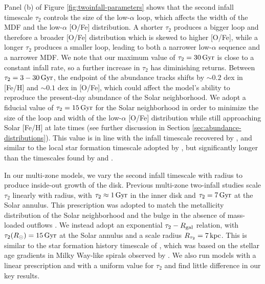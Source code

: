 \documentclass[twocolumn,twocolappendix,linenumbers]{aastex631}
\newcommand{\todo}[1]{{\color{red}#1}}
\newcommand{\kpc}{\,{\rm kpc}}
\newcommand{\Gyr}{\,{\rm Gyr}}
\begin{document}
Panel (b) of Figure \ref{fig:twoinfall-parameters} shows that 
the second infall timescale $\tau_2$ controls the size of the low-$\alpha$ loop, which affects the width of the MDF and the low-$\alpha$ [O/Fe] distribution. A shorter $\tau_2$ produces a bigger loop and therefore a broader [O/Fe] distribution which is skewed to higher [O/Fe], while a longer $\tau_2$ produces a smaller loop, leading to both a narrower low-$\alpha$ sequence and a narrower MDF. We note that our maximum value of $\tau_2=30\,{\rm Gyr}$ is close to a constant infall rate, so a further increase in $\tau_2$ has diminishing returns. Between $\tau_2=3-30\,{\rm Gyr}$, the endpoint of the abundance tracks shifts by $\sim0.2$ dex in [Fe/H] and $\sim0.1$ dex in [O/Fe], which could affect the model's ability to reproduce the present-day abundance of the Solar neighborhood. We adopt a fiducial value of $\tau_2=15\,{\rm Gyr}$ for the Solar neighborhood in order to minimize the size of the loop and width of the low-$\alpha$ [O/Fe] distribution while still approaching Solar [Fe/H] at late times (see further discussion in Section \ref{sec:abundance-distributions}). This value is in line with the infall timescale recovered by \citet{spitoni_galactic_2020}, and similar to the local star formation timescale adopted by \citet{johnson_stellar_2021}, but significantly longer than the timescales found by \citet{nissen_high-precision_2020} and \citet{spitoni_apogee_2021}. 

In our multi-zone models, we vary the second infall timescale with radius to produce inside-out growth of the disk. Previous multi-zone two-infall studies \citep[e.g.,][]{chiappini_abundance_2001,palla_chemical_2020} scale $\tau_2$ linearly with radius, with $\tau_2\approx1\Gyr$ in the inner disk and $\tau_2=7\Gyr$ at the Solar annulus. This prescription was adopted to match the metallicity distribution of the Solar neighborhood and the bulge in the absence of mass-loaded outflows \citep{romano_mass_2000}. We instead adopt an exponential $\tau_2 - R_{\rm gal}$ relation, with $\tau_2(R_\odot)=15\Gyr$ at the Solar annulus and a scale radius $R_{\tau_2}=7\kpc$. This is similar to the star formation history timescale of \citet{johnson_stellar_2021}, which was based on the  stellar age gradients in Milky Way-like spirals observed by \citet{sanchez_spatially_2020}. We also run models with a linear prescription and with a uniform value for $\tau_2$ and find little difference in our key results.
\end{document}
